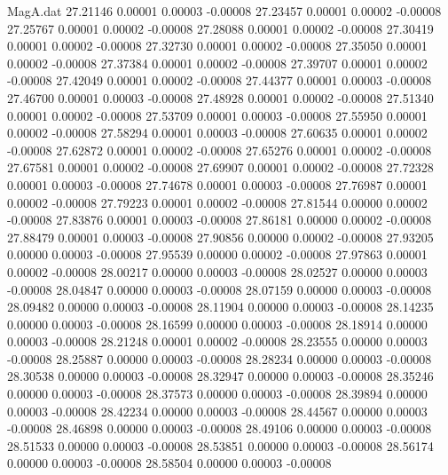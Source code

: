 \begin{filecontents}{MagA.dat}
  27.21146    0.00001    0.00003   -0.00008
  27.23457    0.00001    0.00002   -0.00008
  27.25767    0.00001    0.00002   -0.00008
  27.28088    0.00001    0.00002   -0.00008
  27.30419    0.00001    0.00002   -0.00008
  27.32730    0.00001    0.00002   -0.00008
  27.35050    0.00001    0.00002   -0.00008
  27.37384    0.00001    0.00002   -0.00008
  27.39707    0.00001    0.00002   -0.00008
  27.42049    0.00001    0.00002   -0.00008
  27.44377    0.00001    0.00003   -0.00008
  27.46700    0.00001    0.00003   -0.00008
  27.48928    0.00001    0.00002   -0.00008
  27.51340    0.00001    0.00002   -0.00008
  27.53709    0.00001    0.00003   -0.00008
  27.55950    0.00001    0.00002   -0.00008
  27.58294    0.00001    0.00003   -0.00008
  27.60635    0.00001    0.00002   -0.00008
  27.62872    0.00001    0.00002   -0.00008
  27.65276    0.00001    0.00002   -0.00008
  27.67581    0.00001    0.00002   -0.00008
  27.69907    0.00001    0.00002   -0.00008
  27.72328    0.00001    0.00003   -0.00008
  27.74678    0.00001    0.00003   -0.00008
  27.76987    0.00001    0.00002   -0.00008
  27.79223    0.00001    0.00002   -0.00008
  27.81544    0.00000    0.00002   -0.00008
  27.83876    0.00001    0.00003   -0.00008
  27.86181    0.00000    0.00002   -0.00008
  27.88479    0.00001    0.00003   -0.00008
  27.90856    0.00000    0.00002   -0.00008
  27.93205    0.00000    0.00003   -0.00008
  27.95539    0.00000    0.00002   -0.00008
  27.97863    0.00001    0.00002   -0.00008
  28.00217    0.00000    0.00003   -0.00008
  28.02527    0.00000    0.00003   -0.00008
  28.04847    0.00000    0.00003   -0.00008
  28.07159    0.00000    0.00003   -0.00008
  28.09482    0.00000    0.00003   -0.00008
  28.11904    0.00000    0.00003   -0.00008
  28.14235    0.00000    0.00003   -0.00008
  28.16599    0.00000    0.00003   -0.00008
  28.18914    0.00000    0.00003   -0.00008
  28.21248    0.00001    0.00002   -0.00008
  28.23555    0.00000    0.00003   -0.00008
  28.25887    0.00000    0.00003   -0.00008
  28.28234    0.00000    0.00003   -0.00008
  28.30538    0.00000    0.00003   -0.00008
  28.32947    0.00000    0.00003   -0.00008
  28.35246    0.00000    0.00003   -0.00008
  28.37573    0.00000    0.00003   -0.00008
  28.39894    0.00000    0.00003   -0.00008
  28.42234    0.00000    0.00003   -0.00008
  28.44567    0.00000    0.00003   -0.00008
  28.46898    0.00000    0.00003   -0.00008
  28.49106    0.00000    0.00003   -0.00008
  28.51533    0.00000    0.00003   -0.00008
  28.53851    0.00000    0.00003   -0.00008
  28.56174    0.00000    0.00003   -0.00008
  28.58504    0.00000    0.00003   -0.00008

\end{filecontents}
